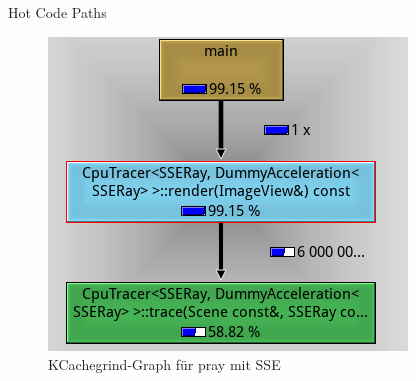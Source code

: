 \begin{frame}{Hot Code Paths}
\begin{figure}[ht]
\begin{columns}
\begin{column}{.48\textwidth}
					\includegraphics[width=\textwidth]{images/callgrind_sse.png}
					\caption{KCachegrind-Graph für pray mit SSE}
				\end{column}
			\end{columns}
	\end{figure}
	\end{frame}

